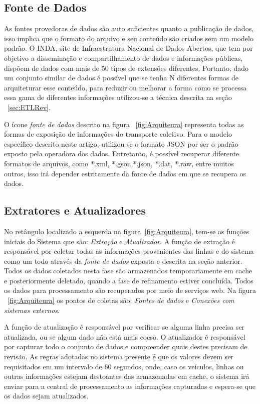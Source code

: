 \documentclass[12pt]{article}
\begin{document}
\subsection{Fonte de Dados}\label{sec:fontdedados}
As fontes provedoras de dados são auto suficientes quanto a publicação de dados, isso implica que o formato do arquivo e seu conteúdo são criados sem um modelo padrão. O INDA, site de Infraestrutura Nacional de Dados Abertos, que tem por objetivo a disseminação e compartilhamento de dados e informações públicas, dispõem de dados com mais de 50 tipos de extensões diferentes\cite{site01}. Portanto, dado um conjunto similar de dados é possível que se tenha N diferentes formas de arquiteturar esse conteúdo, para reduzir ou melhorar a forma como se processa essa gama de diferentes informações utilizou-se a técnica descrita na seção ~\ref{sec:ETLRev}.
     
O ícone \textit{fonte de dados} descrito na figura ~\ref{fig:Arquiteura} representa todas as formas de exposição de informações do transporte coletivo. Para o modelo específico descrito neste artigo, utilizou-se o formato JSON por ser o padrão exposto pela operadora dos dados. Entretanto, é possível recuperar diferente formatos de arquivos, como *.xml, *.gson,*.json, *.dat, *.raw, entre muitos outros, isso irá depender estritamente da fonte de dados em que se recupera os dados.

\subsection{Extratores e Atualizadores}
No retângulo localizado a esquerda na figura~\ref{fig:Arquiteura}, tem-se as funções iniciais do Sistema que são: \textit{Extração} e \textit{Atualizador}. A função de extração é responsável por coletar todas as informações provenientes das linhas e do sistema como um todo através da \textit{fonte de dados} exposta e descrita na seção anterior. Todos os dados coletados nesta fase são armazenados temporariamente em cache e posteriormente deletado, quando a fase de refinamento estiver concluída. Todos os dados para processamento são recuperados por meio de serviços web. Na figura ~\ref{fig:Arquiteura} os pontos de coletas são: \textit{Fontes de dados} e \textit{Conexões com sistemas externos}. 

A função de atualização é responsável por verificar se alguma linha precisa ser atualizada, ou se algum dado não está mais coeso. O atualizador é responsável por capturar todo o conjunto de dados e compreender quais destes precisam de revisão. As regras adotadas no sistema presente é que os valores devem ser requisitados em um intervalo de 60 segundos, onde, caso os veículos, linhas ou outras informações estejam destoantes das armazenadas em cache, o sistema irá enviar para a central de processamento as informações capturadas e espera-se que os dados sejam atualizados.
\end{document}
